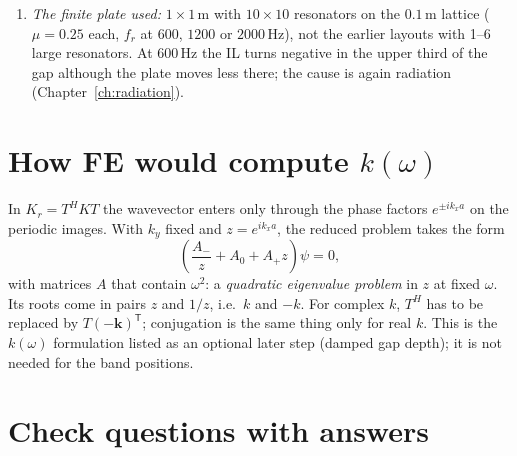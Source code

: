 \begin{enumerate}
        moves, through the near field and the decaying wave. The drive-point mobility
        drops much less than the transfer mobility far away. Which insertion-loss
        definition is used (mobility, radiated power) decides how strongly the gap
        shows. Computed for the radiated power (equal force, full $3\times 3$ shear
        rule, $1 \times 1\,\mathrm{m}$ plate): mean IL $+9.4\,\mathrm{dB}$ inside the Bloch
        gap $1031$--$1194\,\mathrm{Hz}$, peak $+13.0\,\mathrm{dB}$ at $1120\,\mathrm{Hz}$,
        positive across the whole gap. Just above it the IL drops to
        $-13.9\,\mathrm{dB}$ at $1267\,\mathrm{Hz}$, at the flat resonator branch; that dip
        is a radiation effect, not a transmission effect (Chapter~\ref{ch:radiation}).
  \item \emph{The finite plate used:} $1 \times 1\,\mathrm{m}$ with $10 \times 10$
        resonators on the $0.1\,\mathrm{m}$ lattice ($\mu = 0.25$ each, $f_r$ at $600$,
        $1200$ or $2000\,\mathrm{Hz}$), not the earlier layouts with 1--6 large
        resonators. At $600\,\mathrm{Hz}$ the IL turns negative in the upper third of
        the gap although the plate moves less there; the cause is again radiation
        (Chapter~\ref{ch:radiation}).
\end{enumerate}

\section{How FE would compute $k(\omega)$}

In $K_r = T^H K T$ the wavevector enters only through the phase factors
$e^{\pm i k_x a}$ on the periodic images. With $k_y$ fixed and $z = e^{i k_x a}$, the
reduced problem takes the form
\begin{equation}
  \left(\frac{A_{-}}{z} + A_0 + A_{+} z\right)\psi = 0 ,
\end{equation}
with matrices $A$ that contain $\omega^2$: a \emph{quadratic eigenvalue problem} in $z$
at fixed $\omega$. Its roots come in pairs $z$ and $1/z$, i.e.\ $k$ and $-k$. For
complex $k$, $T^H$ has to be replaced by $T(-\mathbf{k})^{\mathsf{T}}$; conjugation is
the same thing only for real $k$. This is the $k(\omega)$ formulation listed as an
optional later step (damped gap depth); it is not needed for the band positions.

\section{Check questions with answers}

